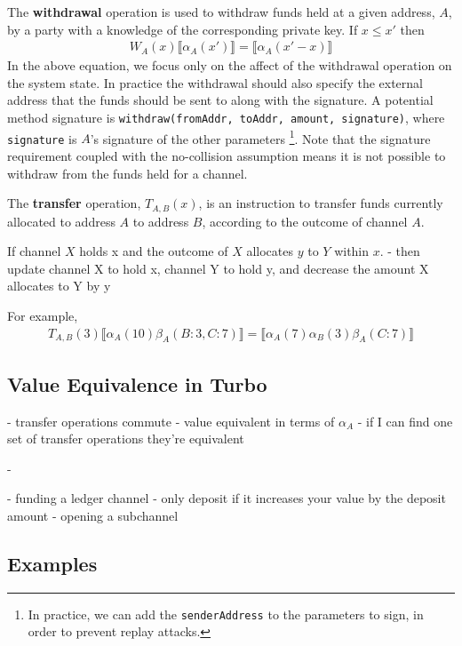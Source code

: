 \documentclass{article}
\theoremstyle{definition}
\newcommand{\adj}[1]{\llbracket #1 \rrbracket}
\begin{document}
The \textbf{withdrawal} operation is used to withdraw funds held at a given 
address, $A$, by a party with a knowledge of the corresponding private key. If $x \leq x'$ then
\begin{align*}
W_A(x) \adj{\alpha_A(x')} = \adj{\alpha_A(x'-x)}
\end{align*}
In the above equation, we focus only on the affect of the withdrawal operation on the system state.
In practice the withdrawal should also specify the external address that the funds should be sent to
along with the signature.
A potential method signature is \texttt{withdraw(fromAddr, toAddr, amount, signature)}, 
where \texttt{signature} is $A$'s signature of the other parameters
\footnote{In practice, we can add the \texttt{senderAddress} to the parameters to sign,
in order to prevent replay attacks.}.
Note that the signature requirement coupled with the no-collision assumption means
it is not possible to withdraw from the funds held for a channel.

The \textbf{transfer} operation, $T_{A,B}(x)$, is an instruction to transfer funds currently allocated
to address $A$ to address $B$, according to the outcome of channel $A$.



If channel $X$ holds x and the outcome of $X$ allocates $y$ to $Y$ within $x$.
- then update channel X to hold x, channel Y to hold y, and decrease the amount X allocates to Y by y

For example, 
\begin{align*}
T_{A,B}(3) \adj{\alpha_A(10)\beta_A(B: 3, C: 7)} = \adj{\alpha_A(7)\alpha_B(3)\beta_A(C: 7)}
\end{align*}

\subsection{Value Equivalence in Turbo}

- transfer operations commute
- value equivalent in terms of $\alpha_A$
- if I can find one set of transfer operations they're equivalent

- 

- funding a ledger channel - only deposit if it increases your value by the deposit amount
- opening a subchannel

\subsection{Examples}
\end{document}
